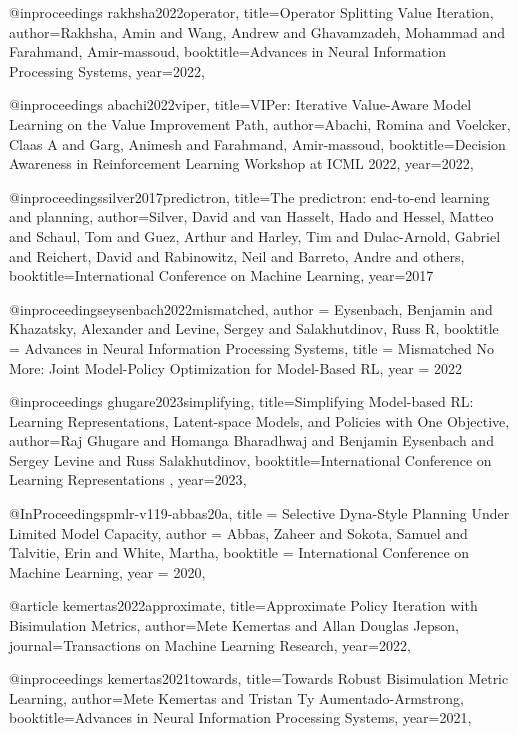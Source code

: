 @inproceedings{
rakhsha2022operator,
title={Operator Splitting Value Iteration},
author={Rakhsha, Amin and Wang, Andrew and Ghavamzadeh, Mohammad and Farahmand, Amir-massoud},
booktitle={Advances in Neural Information Processing Systems},
year={2022},
}

@inproceedings{
abachi2022viper,
title={{VIP}er: Iterative Value-Aware Model Learning on the Value Improvement Path},
author={Abachi, Romina and Voelcker, Claas A and Garg, Animesh and Farahmand, Amir-massoud},
booktitle={Decision Awareness in Reinforcement Learning Workshop at ICML 2022},
year={2022},
}

@inproceedings{silver2017predictron,
  title={The predictron: end-to-end learning and planning},
  author={Silver, David and van Hasselt, Hado and Hessel, Matteo and Schaul, Tom and Guez, Arthur and Harley, Tim and Dulac-Arnold, Gabriel and Reichert, David and Rabinowitz, Neil and Barreto, Andre and others},
  booktitle={International Conference on Machine Learning},
  year={2017}
}

@inproceedings{eysenbach2022mismatched,
 author = {Eysenbach, Benjamin and Khazatsky, Alexander and Levine, Sergey and Salakhutdinov, Russ R},
 booktitle = {Advances in Neural Information Processing Systems},
 title = {Mismatched No More: Joint Model-Policy Optimization for Model-Based RL},
 year = {2022}
}

@inproceedings{
ghugare2023simplifying,
title={Simplifying Model-based {RL}: Learning Representations, Latent-space Models, and Policies with One Objective},
author={Raj Ghugare and Homanga Bharadhwaj and Benjamin Eysenbach and Sergey Levine and Russ Salakhutdinov},
booktitle={International Conference on Learning Representations },
year={2023},
}


@InProceedings{pmlr-v119-abbas20a,
  title = 	 {Selective Dyna-Style Planning Under Limited Model Capacity},
  author =       {Abbas, Zaheer and Sokota, Samuel and Talvitie, Erin and White, Martha},
  booktitle = 	 {International Conference on Machine Learning},
  year = 	 {2020},
}

@article{
kemertas2022approximate,
title={Approximate Policy Iteration with Bisimulation Metrics},
author={Mete Kemertas and Allan Douglas Jepson},
journal={Transactions on Machine Learning Research},
year={2022},
}

@inproceedings{
kemertas2021towards,
title={Towards Robust Bisimulation Metric Learning},
author={Mete Kemertas and Tristan Ty Aumentado-Armstrong},
booktitle={Advances in Neural Information Processing Systems},
year={2021},
}


